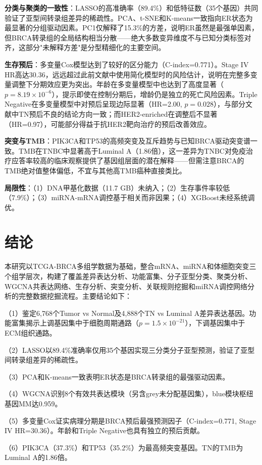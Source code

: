 \documentclass[12pt,a4paper]{ctexart}
\begin{document}
\textbf{分类与聚类的一致性}：LASSO的高准确率（89.4\%）和低特征数（35个基因）共同验证了亚型间转录组差异的稀疏性。PCA、t-SNE和K-means一致指向ER状态为最显著的分组驱动因素。PC1仅解释了15.3\%的方差，说明ER虽然是最强单因素，但BRCA转录组的全局结构相当分散——绝大多数变异维度不与已知分类标签对齐，这部分"未解释方差"是分型精细化的主要空间。

\textbf{生存预后}：多变量Cox模型达到了较好的区分能力（C-index=0.771）。Stage IV HR高达30.36，远远超过此前文献中使用简化模型时的风险估计，说明在完整多变量调整下分期效应更为突出。年龄在多变量模型中也达到了高度显著（$p=8.19\times10^{-6}$），提示即使在控制分期后，增龄仍是独立的死亡风险因素。Triple Negative在多变量模型中对预后呈现边际显著（HR=2.00, $p=0.028$），与部分文献中TN预后不良的结论方向一致；而HER2-enriched在调整后不显著（HR=0.97），可能部分得益于抗HER2靶向治疗的预后改善效应。

\textbf{突变与TMB}：PIK3CA和TP53的高频突变及互斥趋势与已知BRCA驱动突变谱一致。TMB在TNBC中显著高于Luminal A（1.86倍），这一差异为TNBC对免疫治疗应答率较高的临床观察提供了基因组层面的潜在解释——但需注意BRCA的TMB绝对值整体偏低，不宜与其他高TMB癌种直接类比。

\textbf{局限性}：（1）DNA甲基化数据（11.7 GB）未纳入；（2）生存事件率较低（7.9\%）；（3）miRNA-mRNA调控基于相关而非因果；（4）XGBoost未经系统调优。

\section{结论}
本研究以TCGA-BRCA多组学数据为基础，整合mRNA、miRNA和体细胞突变三个组学层次，构建了覆盖差异表达分析、功能富集、分子亚型分类、聚类分析、WGCNA共表达网络、生存分析、突变分析、关联规则挖掘和miRNA调控网络分析的完整数据挖掘流程。主要结论如下：

（1）鉴定6,768个Tumor vs Normal及4,888个TN vs Luminal A差异表达基因。功能富集揭示上调基因集中于细胞周期通路（$p=1.5\times10^{-21}$），下调基因集中于ECM组织通路。

（2）LASSO以89.4\%准确率仅用35个基因实现三分类分子亚型预测，验证了亚型间转录组差异的稀疏性。

（3）PCA和K-means一致表明ER状态是BRCA转录组的最强驱动因素。

（4）WGCNA识别8个有效共表达模块（另含grey未分配基因集），blue模块枢纽基因MM达0.959。

（5）多变量Cox证实病理分期是BRCA预后最强预测因子（C-index=0.771, Stage IV HR=30.36）。年龄和Triple Negative也具有独立的预后贡献。

（6）PIK3CA（37.3\%）和TP53（35.2\%）为最高频突变基因。TN的TMB为Luminal A的1.86倍。
\end{document}
